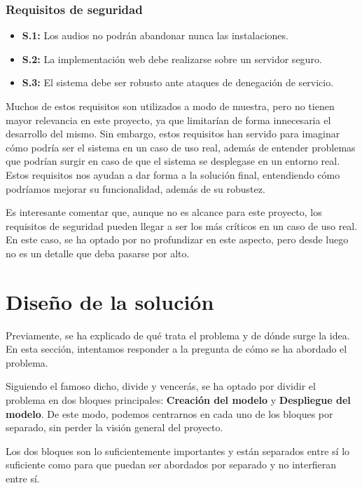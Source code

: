 \subsubsection{Requisitos de seguridad}\label{sec:requisitos-seguridad}
\begin{itemize}\itemsep1pt \parskip0pt 
    \item \textbf{S.1:} Los audios no podrán abandonar nunca las instalaciones.
    \item \textbf{S.2:} La implementación web debe realizarse sobre un servidor seguro.
    \item \textbf{S.3:} El sistema debe ser robusto ante ataques de denegación de servicio.
\end{itemize}

Muchos de estos requisitos son utilizados a modo de muestra, pero no tienen mayor relevancia en este proyecto, ya que limitarían de forma innecesaria el desarrollo del mismo.
Sin embargo, estos requisitos han servido para imaginar cómo podría ser el sistema en un caso de uso real, además de entender problemas que podrían surgir en caso de que el sistema se desplegase en un entorno real.
Estos requisitos nos ayudan a dar forma a la solución final, entendiendo cómo podríamos mejorar su funcionalidad, además de su robustez.

Es interesante comentar que, aunque no es alcance para este proyecto, los requisitos de seguridad pueden llegar a ser los más críticos en un caso de uso real.
En este caso, se ha optado por no profundizar en este aspecto, pero desde luego no es un detalle que deba pasarse por alto.



\section{Diseño de la solución}\label{sec:diseno}

Previamente, se ha explicado de qué trata el problema y de dónde surge la idea.
En esta sección, intentamos responder a la pregunta de cómo se ha abordado el problema.

Siguiendo el famoso dicho, divide y vencerás, se ha optado por dividir el problema en dos bloques principales: \textbf{Creación del modelo} y \textbf{Despliegue del modelo}.
De este modo, podemos centrarnos en cada uno de los bloques por separado, sin perder la visión general del proyecto.

Los dos bloques son lo suficientemente importantes y están separados entre sí lo suficiente como para que puedan ser abordados por separado y no interfieran entre sí.

